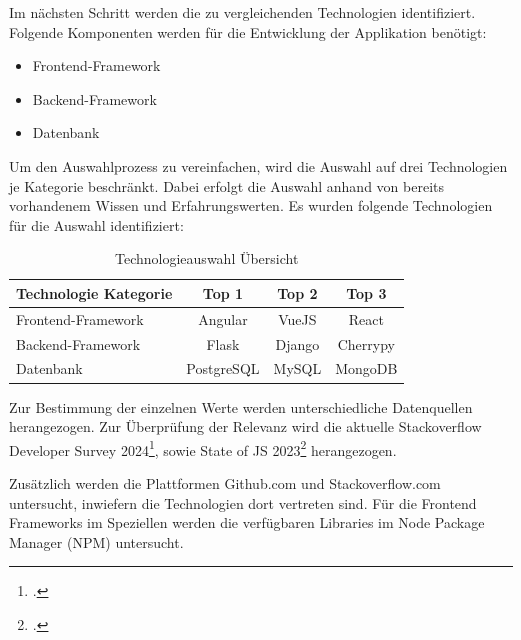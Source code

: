 Im nächsten Schritt werden die zu vergleichenden Technologien identifiziert.
Folgende Komponenten werden für die Entwicklung der Applikation benötigt:

\begin{itemize}
  \item Frontend-Framework
  \item Backend-Framework
  \item Datenbank
\end{itemize}

Um den Auswahlprozess zu vereinfachen, wird die Auswahl auf drei Technologien je Kategorie beschränkt.
Dabei erfolgt die Auswahl anhand von bereits vorhandenem Wissen und Erfahrungswerten.
Es wurden folgende Technologien für die Auswahl identifiziert:

\begin{table}[htbp]
  \centering
  \begin{tabular}{|l|c|c|c|}
      \hline
      \textbf{Technologie Kategorie} & \textbf{Top 1} & \textbf{Top 2} & \textbf{Top 3} \\ \hline
      {Frontend-Framework} & Angular & VueJS & React \\ \hline
      {Backend-Framework} & Flask & Django & Cherrypy \\ \hline
      {Datenbank} & PostgreSQL & MySQL & MongoDB \\ \hline
  \end{tabular}
  \caption{Technologieauswahl Übersicht}\label{tab:Technologieauswahl Übersicht}
\end{table}

Zur Bestimmung der einzelnen Werte werden unterschiedliche Datenquellen herangezogen.
Zur Überprüfung der Relevanz wird die aktuelle Stackoverflow Developer Survey 2024\footcite{StackOverflow2024}, sowie State of JS 2023\footcite{stateofjsStateJavaScript2023} herangezogen.

Zusätzlich werden die Plattformen Github.com und Stackoverflow.com untersucht, inwiefern die Technologien dort vertreten sind.
Für die Frontend Frameworks im Speziellen werden die verfügbaren Libraries im Node Package Manager (NPM) untersucht.

